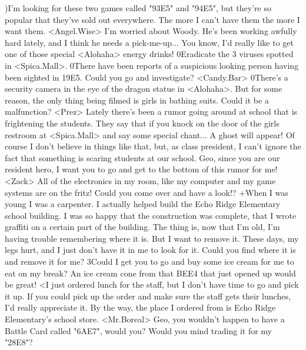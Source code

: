 )I'm looking for these two games called "{93}{E5}"  and "{94}{E5}", 
but they're so popular that they've sold out everywhere. 
The more I can't have them the more I want them. 
<Angel.Wise> I'm worried about Woody. 
He's been working awfully hard lately, and I think he needs a pick-me-up... 
You know, I'd really like to get one of those special <Alohaha> energy drinks! 
0Eradicate the 3 viruses spotted in <Spica.Mall>. 
0There have been reports of a suspicious looking person having been sighted in 
{19}{E5}. Could you go and investigate? 
<Candy.Bar> 
0There's a security camera in the eye of the dragon statue in <Alohaha>. 
But for some reason, the only thing being filmed is girls in bathing suits. 
Could it be a malfunction? 
<Prez> Lately there's been a rumor going around at school 
that is frightening the students. 
They say that if you knock on the door of the girls restroom at 
<Spica.Mall> and say some special chant... 
A ghost will appear! 
Of course I don't believe in things like that, but, as class president, 
I can't ignore the fact that something is scaring students at our school. 
Geo, since you are our resident hero, 
I want you to go and get to the bottom of this rumor for me! 
<Zack> All of the electronics in my room, like my computer 
and my game systems are on the fritz! 
Could you come over and have a look!? 
+When I was young I was a carpenter. I actually 
helped build the Echo Ridge Elementary school building. 
I was so happy that the construction was complete, 
that I wrote graffiti on a certain part of the building. 
The thing is, now that I'm old, I'm having trouble remembering where it is. 
But I want to remove it. 
These days, my legs hurt, and I just don't have it in me to look for it. 
Could you find where it is and remove it for me? 
3Could I get you to go and buy some ice cream for me to eat on my break? 
An ice cream cone from that {BE}{E4} that just opened up would be great! 
<I just ordered lunch for the staff, but I don't have time to go and pick it up. 
If you could pick up the order and make sure the 
staff gets their lunches, I'd really appreciate it. 
By the way, the place I ordered from is 
Echo Ridge Elementary's school store. 
<Mr.Boreal> Geo, you wouldn't happen to have a Battle Card called "{6A}{E7}", would you? 
Would you mind trading it for my "{28}{E8}"? 

